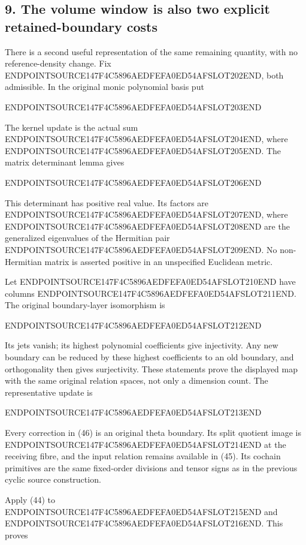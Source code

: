 \subsection{9. The volume window is also two explicit retained-boundary costs}\label{endpoint-arithmetic_original--the-volume-window-is-also-two-explicit-retained-boundary-costs}

There is a second useful representation of the same remaining quantity, with no reference-density change. Fix ENDPOINTSOURCE147F4C5896AEDFEFA0ED54AFSLOT202END, both admissible. In the original monic polynomial basis put

ENDPOINTSOURCE147F4C5896AEDFEFA0ED54AFSLOT203END

The kernel update is the actual sum ENDPOINTSOURCE147F4C5896AEDFEFA0ED54AFSLOT204END, where ENDPOINTSOURCE147F4C5896AEDFEFA0ED54AFSLOT205END. The matrix determinant lemma gives

ENDPOINTSOURCE147F4C5896AEDFEFA0ED54AFSLOT206END

This determinant has positive real value. Its factors are ENDPOINTSOURCE147F4C5896AEDFEFA0ED54AFSLOT207END, where ENDPOINTSOURCE147F4C5896AEDFEFA0ED54AFSLOT208END are the generalized eigenvalues of the Hermitian pair ENDPOINTSOURCE147F4C5896AEDFEFA0ED54AFSLOT209END. No non-Hermitian matrix is asserted positive in an unspecified Euclidean metric.

Let ENDPOINTSOURCE147F4C5896AEDFEFA0ED54AFSLOT210END have columns ENDPOINTSOURCE147F4C5896AEDFEFA0ED54AFSLOT211END. The original boundary-layer isomorphism is

ENDPOINTSOURCE147F4C5896AEDFEFA0ED54AFSLOT212END

Its jets vanish; its highest polynomial coefficients give injectivity. Any new boundary can be reduced by these highest coefficients to an old boundary, and orthogonality then gives surjectivity. These statements prove the displayed map with the same original relation spaces, not only a dimension count. The representative update is

ENDPOINTSOURCE147F4C5896AEDFEFA0ED54AFSLOT213END

Every correction in (46) is an original theta boundary. Its split quotient image is ENDPOINTSOURCE147F4C5896AEDFEFA0ED54AFSLOT214END at the receiving fibre, and the input relation remains available in (45). Its cochain primitives are the same fixed-order divisions and tensor signs as in the previous cyclic source construction.

Apply (44) to ENDPOINTSOURCE147F4C5896AEDFEFA0ED54AFSLOT215END and ENDPOINTSOURCE147F4C5896AEDFEFA0ED54AFSLOT216END. This proves

